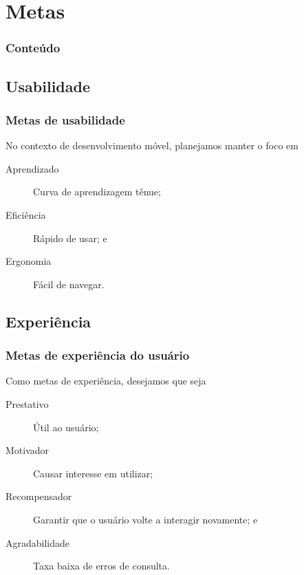 \documentclass[14pt,beamer]{beamer}
\begin{document}
\section{Metas}

\begin{frame}
	\frametitle{Conteúdo}
    \begin{multicols}{2}
        \small
    \end{multicols}
\end{frame}

\subsection{Usabilidade}
\begin{frame}
	\frametitle{Metas de usabilidade}

No contexto de desenvolvimento móvel, planejamos manter o foco em
\begin{description}
\item[Aprendizado] Curva de aprendizagem tênue;
\item[Eficiência] Rápido de usar; e
\item[Ergonomia] Fácil de navegar.
\end{description}

\end{frame}

\subsection{Experiência}
\begin{frame}
	\frametitle{Metas de experiência do usuário}

Como metas de experiência, desejamos que seja
\begin{description}
\item[Prestativo] Útil ao usuário;
\item[Motivador] Causar interesse em utilizar;
\item[Recompensador] Garantir que o usuário volte a interagir novamente; e
\item[Agradabilidade] Taxa baixa de erros de consulta.
\end{description}

\end{frame}
\end{document}
